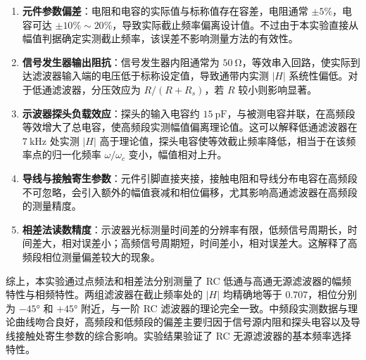 \begin{enumerate}[label=\arabic*.]
    \item \textbf{元件参数偏差}：电阻和电容的实际值与标称值存在容差，电阻通常 \(\pm5\%\)，电容可达 \(\pm10\%\sim20\%\)，导致实际截止频率偏离设计值。不过由于本实验直接从幅值判据确定实测截止频率，该误差不影响测量方法的有效性。

    \item \textbf{信号发生器输出阻抗}：信号发生器内阻通常为 \(\SI{50}{\ohm}\)，等效串入回路，使实际到达滤波器输入端的电压低于标称设定值，导致通带内实测 \(|H|\) 系统性偏低。对于低通滤波器，分压效应为 \(R/(R+R_s)\)，若 \(R\) 较小则影响显著。

    \item \textbf{示波器探头负载效应}：探头的输入电容约 \(\SI{15}{\pico\farad}\)，与被测电容并联，在高频段等效增大了总电容，使高频段实测幅值偏离理论值。这可以解释低通滤波器在 \(\SI{7}{\kilo\hertz}\) 处实测 \(|H|\) 高于理论值，探头电容使等效截止频率降低，相当于在该频率点的归一化频率 \(\omega/\omega_c\) 变小，幅值相对上升。

    \item \textbf{导线与接触寄生参数}：元件引脚直接夹接，接触电阻和导线分布电容在高频段不可忽略，会引入额外的幅值衰减和相位偏移，尤其影响高通滤波器在高频段的测量精度。

    \item \textbf{相差法读数精度}：示波器光标测量时间差的分辨率有限，低频信号周期长，时间差大，相对误差小；高频信号周期短，时间差小，相对误差大。这解释了高频段相位测量偏差较大的现象。
\end{enumerate}

综上，本实验通过点频法和相差法分别测量了 RC 低通与高通无源滤波器的幅频特性与相频特性。两组滤波器在截止频率处的 \(|H|\) 均精确地等于 \(0.707\)，相位分别为 \(-45°\) 和 \(+45°\) 附近，与一阶 RC 滤波器的理论完全一致。中频段实测数据与理论曲线吻合良好，高频段和低频段的偏差主要归因于信号源内阻和探头电容以及导线接触处寄生参数的综合影响。实验结果验证了 RC 无源滤波器的基本频率选择特性。

